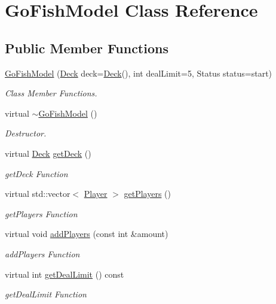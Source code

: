 \hypertarget{classGoFishModel}{\section{Go\-Fish\-Model Class Reference}
\label{classGoFishModel}
}
\subsection*{Public Member Functions}
\begin{DoxyCompactItemize}
\item 
\hyperlink{classGoFishModel_a18a2241fe7c0147956aaaee9ff0fad15}{Go\-Fish\-Model} (\hyperlink{classDeck}{Deck} deck=\hyperlink{classDeck}{Deck}(), int deal\-Limit=5, Status status=start)
\begin{DoxyCompactList}\small\item\em Class Member Functions. \end{DoxyCompactList}\item 
virtual \hyperlink{classGoFishModel_a948f0c71a0ebf02c584d0d3ea99e9fed}{$\sim$\-Go\-Fish\-Model} ()
\begin{DoxyCompactList}\small\item\em Destructor. \end{DoxyCompactList}\item 
virtual \hyperlink{classDeck}{Deck} \hyperlink{classGoFishModel_a92f340e9cb2fc33660154fa77a03eae8}{get\-Deck} ()
\begin{DoxyCompactList}\small\item\em get\-Deck Function \end{DoxyCompactList}\item 
virtual std\-::vector$<$ \hyperlink{classPlayer}{Player} $>$ \hyperlink{classGoFishModel_a0757356fe42888a784517da359766482}{get\-Players} ()
\begin{DoxyCompactList}\small\item\em get\-Players Function \end{DoxyCompactList}\item 
virtual void \hyperlink{classGoFishModel_a89310218826d671881684d9561dc5387}{add\-Players} (const int \&amount)
\begin{DoxyCompactList}\small\item\em add\-Players Function \end{DoxyCompactList}\item 
virtual int \hyperlink{classGoFishModel_a7468c7abc047691bc1413b21114ffb0b}{get\-Deal\-Limit} () const 
\begin{DoxyCompactList}\small\item\em get\-Deal\-Limit Function \end{DoxyCompactList}\item 

\end{DoxyCompactItemize}
